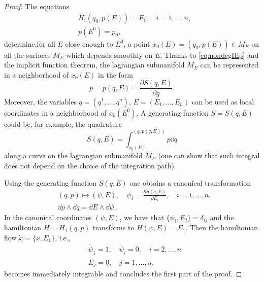 \documentclass[english,fontsize=11pt,paper=b5]{scrbook}
\theoremstyle{definition}
\begin{document}
\begin{proof}
        The equations
        \begin{align}
     & H_i(q_0, p(E)) = E_i,\quad i = 1,\ldots,n, \\
     & p(E^0) = p_0,
        \end{align}
        determine,for all $E$ close enough to $E^0$, a point $x_0(E) = (q_0, p(E))\in M_E$ on all the surfaces $M_E$ which depends smoothly on $E$.
        Thanks to \eqref{eq:nondegHip} and the implicit function theorem, the lagrangian submanifold $M_E$ can be represented in a neighborhood of $x_0(E)$ in the form
        \begin{equation}
          p = p(q,E) = \frac{\partial S(q,E)}{\partial q}.
        \end{equation}
        Moreover, the variables $q=(q^1, \ldots, q^n)$, $E= (E_1,\ldots,E_n)$ can be used as local coordinates in a neighborhood of $x_0(E^0)$. A generating function $S=S(q,E)$ could be, for example, the quadrature
        \begin{equation}
          S(q,E) = \int_{x_0(E)}^{(q,p(q,E))} p \dd q
        \end{equation}
        along a curve on the lagrangian submanifold $M_E$ (one can show that such integral does not depend on the choice of the integration path).

        Using the generating function $S(q,E)$ one obtains a canonical transformation
        \begin{align}
     & (q,p)\mapsto (\psi, E), \quad \psi_i = \frac{\partial S(q,E)}{\partial E_i}, \quad i=1,\ldots,n, \\
     & \dd p \wedge \dd q = \dd E \wedge \dd \psi.
        \end{align}
        In the canonical coordinates $(\psi, E)$, we have that $\{\psi_i, E_j\} = \delta_{ij}$ and the hamiltonian $H = H_1(q,p)$ transforms to $H(\psi, E) = E_1$. Then the hamiltonian flow $\dot x = \{x, E_1\}$, i.e.,
        \begin{align}
     & \dot \psi_1 = 1, \quad \dot \psi_i = 0, \quad i=2,\ldots,n \\
     & \dot E_j = 0, \quad j = 1,\ldots, n,
        \end{align}
        becomes immediately integrable and concludes the first part of the proof.
        \medskip


\end{proof}
\end{document}
